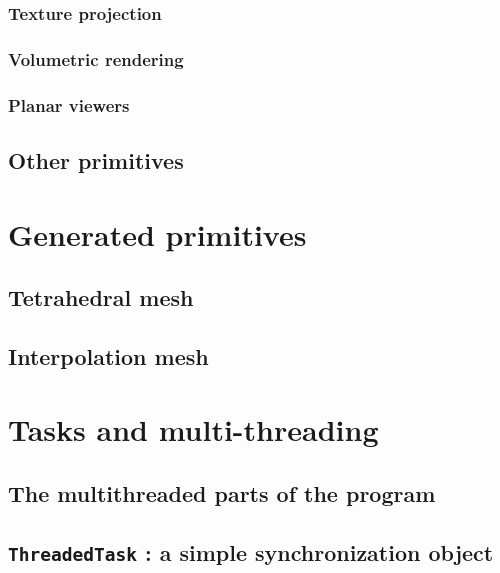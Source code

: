 {{		\subsubsection{Texture projection}\label{text:03_software_components:02_visualization:01_grids:01_solid}
		{
		}
		\subsubsection{Volumetric rendering}\label{text:03_software_components:02_visualization:01_grids:01_volumetric}
		{
		}
		\subsubsection{Planar viewers}\label{text:03_software_components:02_visualization:01_grids:01_planar}
		{
		}
	}

	\subsection{Other primitives}\label{text:03_software_components:02_visualization:02_other}
	{

	}
}

\section{Generated primitives}\label{text:03_software_components:03_generated_primitives}
{

	\subsection{Tetrahedral mesh}
	{
	}

	\subsection{Interpolation mesh}
	{
	}
}

\section{Tasks and multi-threading}\label{text:03_software_components:04_tasks}
{

	\subsection{The multithreaded parts of the program}
	{
	}

	\subsection{\texttt{ThreadedTask} : a simple synchronization object}
	{
	}
}

